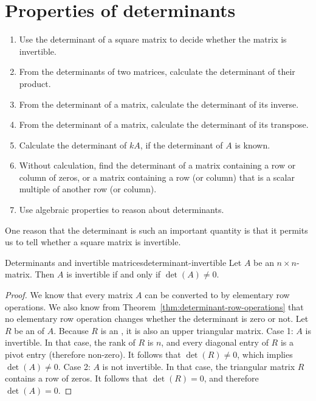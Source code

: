 \section{Properties of determinants}

\begin{outcome}
  \begin{enumerate}
  \item Use the determinant of a square matrix to decide whether the
    matrix is invertible.
  \item From the determinants of two matrices, calculate the
    determinant of their product.
  \item From the determinant of a matrix, calculate the determinant of
    its inverse.
  \item From the determinant of a matrix, calculate the determinant of
    its transpose.
  \item Calculate the determinant of $kA$, if the determinant of $A$
    is known.
  \item Without calculation, find the determinant of a matrix
    containing a row or column of zeros, or a matrix containing a row
    (or column) that is a scalar multiple of another row (or column).
  \item Use algebraic properties to reason about determinants.
  \end{enumerate}
\end{outcome}

One reason that the determinant is such an important quantity is that
it permits us to tell whether a square matrix is invertible.

\begin{theorem}{Determinants and invertible matrices}{determinant-invertible}
  Let $A$ be an $n\times n$-matrix. Then $A$ is invertible%
   if and
  only if $\det(A) \neq 0$.
\end{theorem}

\begin{proof}
  We know that every matrix $A$ can be converted to {\ef} by
  elementary row operations. We also know from
  Theorem~\ref{thm:determinant-row-operations} that no elementary row
  operation changes whether the determinant is zero or not.  Let $R$
  be an {\ef} of $A$. Because $R$ is an {\ef}, it is also an upper
  triangular matrix. Case 1: $A$ is invertible. In that case, the rank
  of $R$ is $n$, and every diagonal entry of $R$ is a pivot entry
  (therefore non-zero). It follows that $\det(R)\neq 0$, which implies
  $\det(A)\neq 0$. Case 2: $A$ is not invertible. In that case, the
  triangular matrix $R$ contains a row of zeros. It follows that
  $\det(R)=0$, and therefore $\det(A)=0$.
\end{proof}


